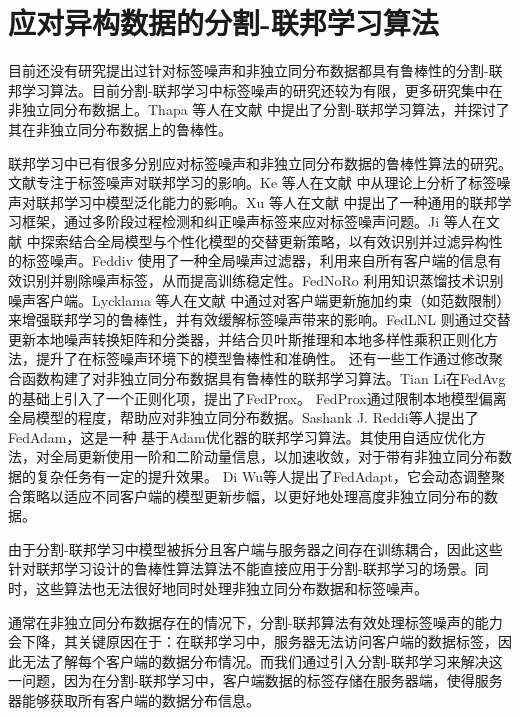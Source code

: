  \section{应对异构数据的分割-联邦学习算法}
 目前还没有研究提出过针对标签噪声和非独立同分布数据都具有鲁棒性的分割-联邦学习算法。目前分割-联邦学习中标签噪声的研究还较为有限，更多研究集中在非独立同分布数据上。Thapa 等人在文献 \cite{thapa2022splitfed} 中提出了分割-联邦学习算法，并探讨了其在非独立同分布数据上的鲁棒性。

联邦学习中已有很多分别应对标签噪声和非独立同分布数据的鲁棒性算法的研究。 文献\cite{ke2023impact,wu2023fednoro,b9,lycklama2023rofl, b23, ji2024fedfixer,zhou2024federated,li2024feddiv}专注于标签噪声对联邦学习的影响。Ke 等人在文献 \cite{ke2023impact} 中从理论上分析了标签噪声对联邦学习中模型泛化能力的影响。Xu 等人在文献 \cite{b9} 中提出了一种通用的联邦学习框架，通过多阶段过程检测和纠正噪声标签来应对标签噪声问题。Ji 等人在文献 \cite{ji2024fedfixer} 中探索结合全局模型与个性化模型的交替更新策略，以有效识别并过滤异构性的标签噪声。Feddiv \cite{li2024feddiv} 使用了一种全局噪声过滤器，利用来自所有客户端的信息有效识别并剔除噪声标签，从而提高训练稳定性。FedNoRo \cite{wu2023fednoro} 利用知识蒸馏技术识别噪声客户端。Lycklama 等人在文献 \cite{lycklama2023rofl} 中通过对客户端更新施加约束（如范数限制）来增强联邦学习的鲁棒性，并有效缓解标签噪声带来的影响。FedLNL \cite{zhou2024federated} 则通过交替更新本地噪声转换矩阵和分类器，并结合贝叶斯推理和本地多样性乘积正则化方法，提升了在标签噪声环境下的模型鲁棒性和准确性。
还有一些工作通过修改聚合函数构建了对非独立同分布数据具有鲁棒性的联邦学习算法。Tian Li在FedAvg的基础上引入了一个正则化项，提出了FedProx\cite{li2020federated}。
FedProx通过限制本地模型偏离全局模型的程度，帮助应对非独立同分布数据。Sashank J. Reddi等人提出了FedAdam\cite{reddi2020adaptive}，这是一种
基于Adam优化器的联邦学习算法。其使用自适应优化方法，对全局更新使用一阶和二阶动量信息，以加速收敛，对于带有非独立同分布数据的复杂任务有一定的提升效果。
Di Wu等人提出了FedAdapt\cite{wu2022fedadapt}，它会动态调整聚合策略以适应不同客户端的模型更新步幅，以更好地处理高度非独立同分布的数据。

由于分割-联邦学习中模型被拆分且客户端与服务器之间存在训练耦合，因此这些针对联邦学习设计的鲁棒性算法算法不能直接应用于分割-联邦学习的场景。同时，这些算法也无法很好地同时处理非独立同分布数据和标签噪声。
 
通常在非独立同分布数据存在的情况下，分割-联邦算法有效处理标签噪声的能力会下降，其关键原因在于：在联邦学习中，服务器无法访问客户端的数据标签，因此无法了解每个客户端的数据分布情况。而我们通过引入分割-联邦学习来解决这一问题，因为在分割-联邦学习中，客户端数据的标签存储在服务器端，使得服务器能够获取所有客户端的数据分布信息。

